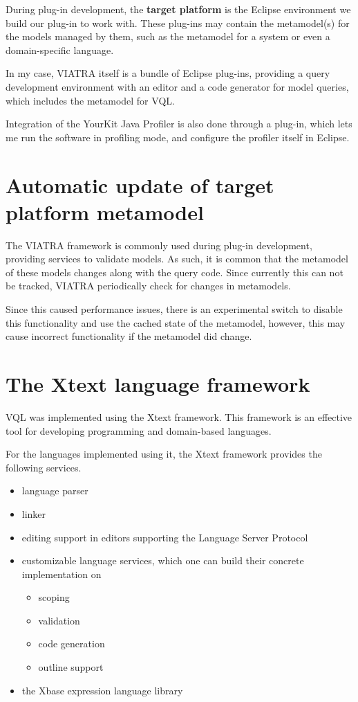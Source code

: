 \documentclass[11pt,a4paper,oneside]{report}
\begin{document}
During plug-in development, the \textbf{target platform} is the Eclipse
environment we build our plug-in to work with. These plug-ins may contain
the metamodel(s) for the models managed by them, such as the metamodel for a
system or even a domain-specific language.

In my case, VIATRA itself is a bundle of Eclipse plug-ins, providing a query
development environment with an editor and a code generator for model
queries, which includes the metamodel for VQL\cite{viatra}.

Integration of the YourKit Java Profiler is also done through a plug-in, which
lets me run the software in profiling mode, and configure the profiler itself
in Eclipse.

\pagebreak
\section{Automatic update of target platform metamodel}\label{sec:MetamodelUpdate}
The VIATRA framework is commonly used during plug-in development, providing
services to validate models. As such, it is common that the metamodel of these
models changes along with the query code. Since currently this can not be
tracked, VIATRA periodically check for changes in metamodels.

Since this caused performance issues, there is an experimental switch to disable
this functionality and use the cached state of the metamodel, however, this may
cause incorrect functionality if the metamodel did change.

\section{The Xtext language framework}
VQL was implemented using the Xtext framework. This framework is an effective
tool for developing programming and domain-based languages.

For the languages implemented using it, the Xtext framework provides the
following services\cite{xtext}.

\begin{itemize}
    \item{language parser}
    \item{linker}
    \item{editing support in editors supporting the Language Server Protocol}
    \item{
        customizable language services, which one can build their concrete
        implementation on
        \begin{itemize}
            \item{scoping}
            \item{validation}
            \item{code generation}
            \item{outline support}
        \end{itemize}
    }
    \item{the Xbase expression language library}
\end{itemize}
\end{document}
